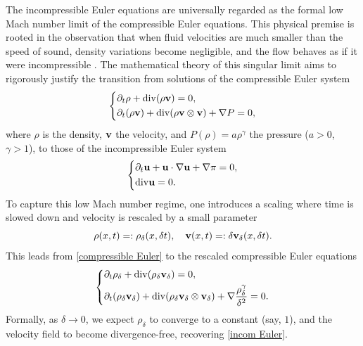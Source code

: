 \documentclass[12pt,reqno]{amsart}
\theoremstyle{definition}
\theoremstyle{remark}
\numberwithin{equation}{section}
\renewcommand{\u}{{\bf u}}
\newcommand{\Dv}{{\rm div}}
\renewcommand{\v}{{\bf v}}
\begin{document}
The incompressible Euler equations are universally regarded as the formal low Mach number limit of the compressible Euler equations. This physical premise is rooted in the observation that when fluid velocities are much smaller than the speed of sound, density variations become negligible, and the flow behaves as if it were incompressible \cite{KM2, Majda, MaS}. The mathematical theory of this singular limit aims to rigorously justify the transition from solutions of the compressible Euler system
\begin{equation} 
\label{compressible Euler}
\left\{
\begin{split}
&\partial_t \rho + \Dv (\rho \v)= 0,
\\&\partial_t (\rho \v) + \Dv (\rho \v \otimes \v) + \nabla P = 0,
\end{split}
\right.
\end{equation} 
where $\rho$ is the density, $\v$ the velocity, and $P(\rho) = a \rho^\gamma$ the pressure ($a > 0$, $\gamma > 1$), to those of the incompressible Euler system
\begin{equation}\label{incom Euler} 
\left\{
\begin{split}&
\partial_t \u + \u\cdot\nabla\u+\nabla \pi=0,
\\&  \Dv \u=0.
\end{split}\right.
\end{equation}
To capture this low Mach number regime, one introduces a scaling where time is slowed down and velocity is rescaled by a small parameter
\[
{\rho}(x,t) =: \rho_\delta(x,\delta t), \quad {\v}(x,t) =: \delta \v_\delta(x,\delta t).
\]
This leads from \eqref{compressible Euler} to the rescaled compressible Euler equations
\begin{equation}
\label{scalling system 111}
\left\{
\begin{split}
&\partial_t\rho_{\delta}+\Dv(\rho_{\delta} \v_{\delta})=0,
\\&\partial_t(\rho_{\delta} \v_{\delta})+\Dv(\rho_{\delta} \v_{\delta}\otimes \v_{\delta})+\nabla\frac{\rho_{\delta}^\gamma}{\delta^2}=0.
\end{split}
\right.
\end{equation} 
Formally, as $\delta \to 0$, we expect $\rho_\delta$ to converge to a constant (say, $1$), and the velocity field to become divergence-free, recovering \eqref{incom Euler}. 
\end{document}
